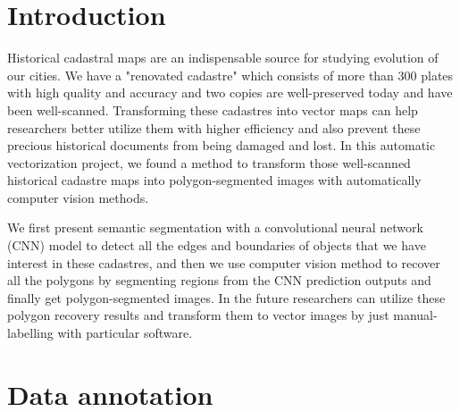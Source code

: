 \documentclass[12pt]{article}
\date{\today}
\begin{document}


\clearpage
\thispagestyle{empty}
\tableofcontents

\clearpage
{}
\setcounter{page}{1}

\section{Introduction}
Historical cadastral maps are an indispensable source for studying evolution of our cities. We have a "renovated cadastre" which consists of more than 300 plates with high quality and accuracy and two copies are well-preserved today and have been well-scanned. Transforming these cadastres into vector maps can help researchers better utilize them with higher efficiency and also prevent these precious historical documents from being damaged and lost. In this automatic vectorization project, we found a method to transform those well-scanned historical cadastre maps into polygon-segmented images with automatically computer vision methods. 

We first present semantic segmentation with a convolutional neural network (CNN) model to detect all the edges and boundaries of objects that we have interest in these cadastres, and then we use computer vision method to recover all the polygons by segmenting regions from the CNN prediction outputs and finally get polygon-segmented images. In the future researchers can utilize these polygon recovery results and transform them to vector images by just manual-labelling with particular software.

\section{Data annotation}
\end{document}
